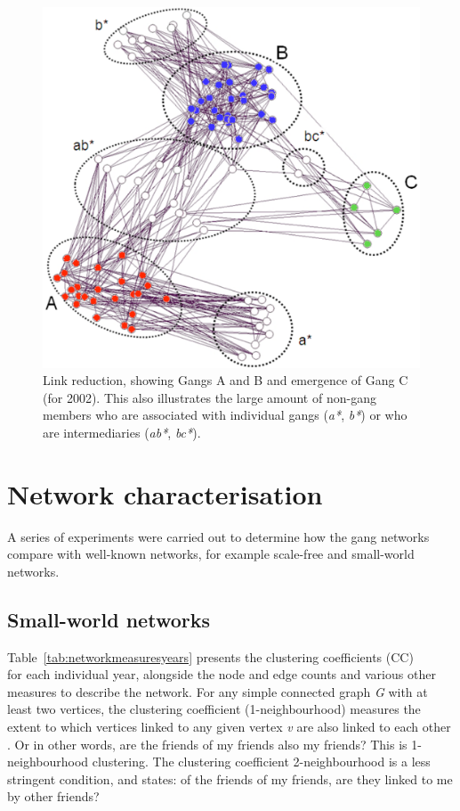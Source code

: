 \documentclass[twocolumn]{svjour3}          %
\theoremstyle{definition}
\begin{document}
\begin{figure}[!ht]
\centering
\includegraphics[width=\columnwidth]{images/2002core_labelled}
\caption{Link reduction, showing Gangs A and B and emergence of
  Gang C (for 2002). This also illustrates the large amount of non-gang
  members who are associated with individual gangs (\emph{a*}, \emph{b*}) or who are intermediaries (\emph{ab*}, \emph{bc*}).}
\label{fig:2002core_labelled}
\end{figure}


\section{Network characterisation}\label{sec:networkcharacteristics}

A series of experiments were carried out to determine how the gang
networks compare with well-known networks, for example scale-free and
small-world networks.

\subsection{Small-world networks}\label{sec:smallworld}

Table~\ref{tab:networkmeasuresyears} presents the clustering
coefficients (CC)\\ \citep{WattsStrogatz1998} for each individual year,
alongside the node and edge counts and various other measures to
describe the network. For any simple connected graph \emph{G} with at
least two vertices, the clustering coefficient (1-neighbourhood) measures the extent to
which vertices linked to any given vertex \emph{v} are also linked to
each other \citep{WattsStrogatz1998}. Or in other words, are the friends of my friends also my
friends? This is 1-neighbourhood clustering. The clustering
coefficient 2-neighbourhood is a less stringent condition, and states:
of the friends of my friends, are they linked to me by other friends?
\end{document}
